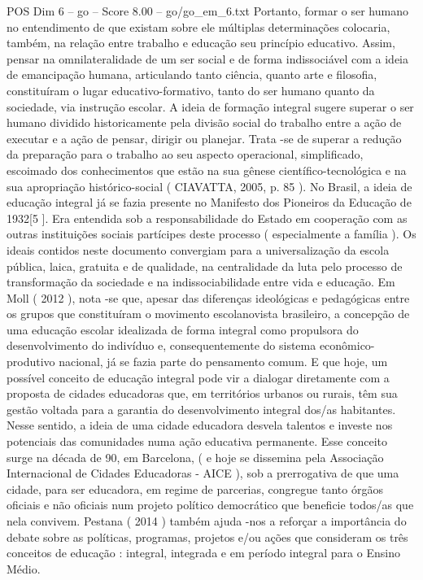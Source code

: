 \begin{textsample}{POS Dim 6 – go – Score 8.00 – go/go\_em\_6.txt}
Portanto, formar o ser humano no entendimento de que existam sobre ele múltiplas determinações colocaria, também, na relação entre trabalho e educação seu princípio educativo.
Assim, pensar na omnilateralidade de um ser social e de forma indissociável com a ideia de emancipação humana, articulando tanto ciência, quanto arte e filosofia, constituíram o lugar educativo-formativo, tanto do ser humano quanto da sociedade, via instrução escolar.
A ideia de formação integral sugere superar o ser humano dividido historicamente pela divisão social do trabalho entre a ação de executar e a ação de pensar, dirigir ou planejar.
Trata -se de superar a redução da preparação para o trabalho ao seu aspecto operacional, simplificado, escoimado dos conhecimentos que estão na sua gênese científico-tecnológica e na sua apropriação histórico-social ( CIAVATTA, 2005, p. 85 ).
No Brasil, a ideia de educação integral já se fazia presente no Manifesto dos Pioneiros da Educação de 1932[5 ].
Era entendida sob a responsabilidade do Estado em cooperação com as outras instituições sociais partícipes deste processo ( especialmente a família ).
Os ideais contidos neste documento convergiam para a universalização da escola pública, laica, gratuita e de qualidade, na centralidade da luta pelo processo de transformação da sociedade e na indissociabilidade entre vida e educação.
Em Moll ( 2012 ), nota -se que, apesar das diferenças ideológicas e pedagógicas entre os grupos que constituíram o movimento escolanovista brasileiro, a concepção de uma educação escolar idealizada de forma integral como propulsora do desenvolvimento do indivíduo e, consequentemente do sistema econômico-produtivo nacional, já se fazia parte do pensamento comum.
E que hoje, um possível conceito de educação integral pode vir a dialogar diretamente com a proposta de cidades educadoras que, em territórios urbanos ou rurais, têm sua gestão voltada para a garantia do desenvolvimento integral dos/as habitantes.
Nesse sentido, a ideia de uma cidade educadora desvela talentos e investe nos potenciais das comunidades numa ação educativa permanente.
Esse conceito surge na década de 90, em Barcelona, ( e hoje se dissemina pela Associação Internacional de Cidades Educadoras - AICE ), sob a prerrogativa de que uma cidade, para ser educadora, em regime de parcerias, congregue tanto órgãos oficiais e não oficiais num projeto político democrático que beneficie todos/as que nela convivem.
Pestana ( 2014 ) também ajuda -nos a reforçar a importância do debate sobre as políticas, programas, projetos e/ou ações que consideram os três conceitos de educação : integral, integrada e em período integral para o Ensino Médio.

\end{textsample}
